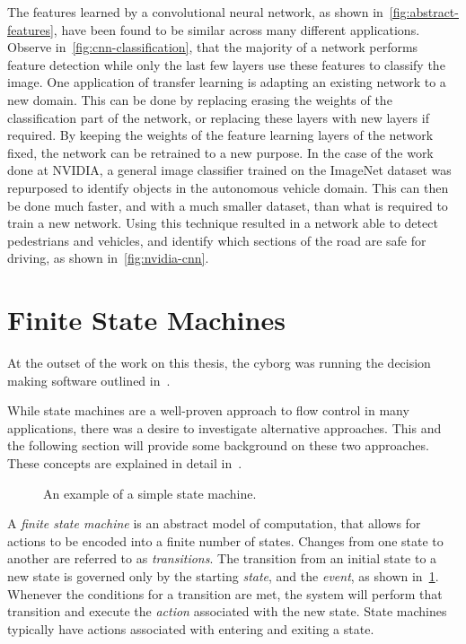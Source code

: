 \documentclass[\rootfolder/main.tex]{subfiles}
\begin{document}
The features learned by a convolutional neural network, as shown in~\cref{fig:abstract-features}, have been found to be similar across many different applications.
Observe in~\cref{fig:cnn-classification}, that the majority of a network performs feature detection while only the last few layers use these features to classify the image.
One application of transfer learning is adapting an existing network to a new domain.
This can be done by replacing erasing the weights of the classification part of the network, or replacing these layers with new layers if required.
By keeping the weights of the feature learning layers of the network fixed, the network can be retrained to a new purpose.
In the case of the work done at NVIDIA, a general image classifier trained on the ImageNet dataset was repurposed to identify objects in the autonomous vehicle domain.
This can then be done much faster, and with a much smaller dataset, than what is required to train a new network.
Using this technique resulted in a network able to detect pedestrians and vehicles, and identify which sections of the road are safe for driving, as shown in~\cref{fig:nvidia-cnn}\cite{NVIDIA}.


\section{Finite State Machines}

At the outset of the work on this thesis, the cyborg was running the decision making software outlined in~\cite{Andersen2017}.

While state machines are a well-proven approach to flow control in many applications, there was a desire to investigate alternative approaches.
This and the following section will provide some background on these two approaches.
These concepts are explained in detail in~\cite{Millington2009}.

\begin{figure}
    \caption{An example of a simple state machine.}
    \label{fig:fsm}
\end{figure}

A \emph{finite state machine} is an abstract model of computation, that allows for actions to be encoded into a finite number of states.
Changes from one state to another are referred to as \emph{transitions}.
The transition from an initial state to a new state is governed only by the starting \emph{state}, and the \emph{event}, as shown in~\cref{fig:fsm}.
Whenever the conditions for a transition are met, the system will perform that transition and execute the \emph{action} associated with the new state.
State machines typically have actions associated with entering and exiting a state.
\end{document}
